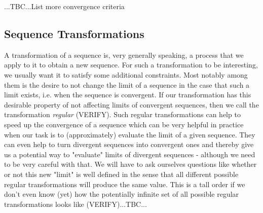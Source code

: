 
...TBC...List more convergence criteria


\subsection{Sequence Transformations}
A transformation of a sequence is, very generally speaking, a process that we apply to it to obtain a new sequence. For such a transformation to be interesting, we usually want it to satisfy some additional constraints. Most notably among them is the desire to not change the limit of a sequence in the case that such a limit exists, i.e. when the sequence is convergent. If our transformation has this desirable property of not affecting limits of convergent sequences, then we call the transformation \emph{regular} (VERIFY). Such regular transformations can help to speed up the convergence of a sequence which can be very helpful in practice when our task is to (approximately) evaluate the limit of a given sequence. They can even help to turn divergent sequences into convergent ones and thereby give us a potential way to "evaluate" limits of divergent sequences - although we need to be very careful with that. We will have to ask ourselves questions like whether or not this new "limit" is well defined in the sense that all different possible regular transformations will produce the same value. This is a tall order if we don't even know (yet) how the potentially infinite set of all possible regular transformations looks like (VERIFY)...TBC...







